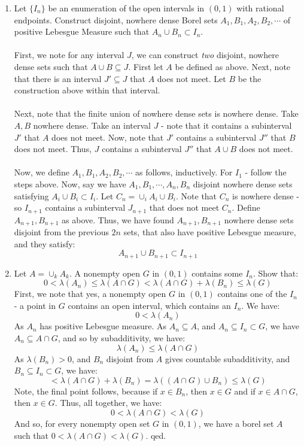 \documentclass[12pt,a4paper]{article}
\newcommand{\1}[1]{\mathbbm{1}\left\{ #1 \right\}}
\begin{document}
\begin{enumerate}
	\item Let $\{I_n\}$ be an enumeration of the open intervals in $(0,1)$ with rational endpoints. Construct disjoint, nowhere dense Borel sets $A_1, B_1, A_2, B_2, \cdots$ of positive Lebesgue Measure such that $A_n \cup B_n \subset I_n$.
	\\\\
	First, we note for any interval $J$, we can construct \textit{two} disjoint, nowhere dense sets such that $A \cup B \subseteq J$. First let $A$ be defined as above. Next, note that there is an interval $J' \subseteq J$ that $A$ does not meet. Let $B$ be the construction above within that interval.
	\\\\
	Next, note that the finite union of nowhere dense sets is nowhere dense. Take $A,B$ nowhere dense. Take an interval $J$ - note that it contains a subinterval $J'$ that $A$ does not meet. Now, note that $J'$ contains a subinterval $J''$ that $B$ does not meet. Thus, $J$ contains a subinterval $J''$ that $A \cup B$ does not meet.
	\\\\
	Now, we define $A_1, B_1, A_2, B_2, \cdots$ as follows, inductively. For $I_1$ - follow the steps above. Now, say we have $A_1,B_1, \cdots, A_n,B_n$ disjoint nowhere dense sets satisfying $A_i \cup B_i \subset I_i$. Let $C_n = \cup_i A_i \cup B_i$. Note that $C_n$ is nowhere dense - so $I_{n+1}$ contains a subinterval $J_{n+1}$ that does not meet $C_n$. Define $A_{n+1},B_{n+1}$ as above. Thus, we have found $A_{n+1},B_{n+1}$ nowhere dense sets disjoint from the previous $2n$ sets, that also have positive Lebesgue measure, and they satisfy:
	$$
		A_{n+1} \cup B_{n+1} \subset I_{n+1}
	$$
	
	\item Let $A = \cup_k A_k$. A nonempty open $G$ in $(0,1)$ contains some $I_n$. Show that:
	$$
		0 < \lambda(A_n) \leq \lambda(A \cap G) < \lambda(A \cap G) + \lambda(B_n) \leq \lambda(G)
	$$
	First, we note that yes, a nonempty open $G$ in $(0,1)$ contains one of the $I_n$ - a point in $G$ contains an open interval, which contains an $I_n$. We have:
	$$
		0 < \lambda(A_n)
	$$
	As $A_n$ has positive Lebesgue measure. As $A_n \subseteq A$, and $A_n \subseteq I_n \subset G$, we have $A_n \subseteq A \cap G$, and so by subadditivity, we have:
	$$
		\lambda(A_n) \leq \lambda(A \cap G)
	$$
	As $\lambda(B_n) > 0$, and $B_n$ disjoint from $A$ gives countable subadditivity, and $B_n \subseteq I_n \subset G$, we have:
	$$
		< \lambda(A \cap G) + \lambda(B_n) = \lambda((A \cap G) \cup B_n) \leq \lambda(G)
	$$
	Note, the final point follows, because if $x \in B_n$, then $x \in G$ and if $x \in A \cap G$, then $x \in G$. Thus, all together, we have:
	$$
		0 < \lambda(A \cap G) < \lambda(G)
	$$
	And so, for every nonempty open set $G$ in $(0,1)$, we have a borel set $A$ such that $0 < \lambda(A \cap G) < \lambda(G)$. qed.
	
\end{enumerate}
\end{document}
